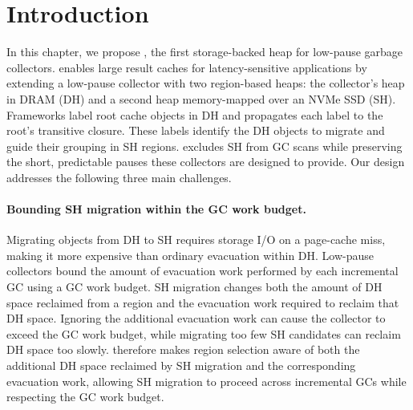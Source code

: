 \section{Introduction}

In this chapter, we propose \chipperName{}, the first storage-backed heap for low-pause garbage collectors.
\chipperName{} enables large result caches for latency-sensitive applications by extending a low-pause collector with two region-based heaps: the collector's heap in DRAM (DH) and a second heap memory-mapped over an NVMe SSD (SH).
Frameworks label root cache objects in DH and \chipperName{} propagates each label to the root's transitive closure.
These labels identify the DH objects to migrate and guide their grouping in SH regions.
\chipperName{} excludes SH from GC scans while preserving the short, predictable pauses these collectors are designed to provide.
Our design addresses the following three main challenges.


\paragraph{\textbf{Bounding SH migration within the GC work budget.}}
Migrating objects from DH to SH requires storage I/O on a page-cache miss, making it more expensive than ordinary evacuation within DH.
Low-pause collectors bound the amount of evacuation work performed by each incremental GC using a GC work budget.
SH migration changes both the amount of DH space reclaimed from a region and the evacuation work required to reclaim that DH space.
Ignoring the additional evacuation work can cause the collector to exceed the GC work budget, while migrating too few SH candidates can reclaim DH space too slowly.
\chipperName{} therefore makes region selection aware of both the additional DH space reclaimed by SH migration and the corresponding evacuation work, allowing SH migration to proceed across incremental GCs while respecting the GC work budget.

